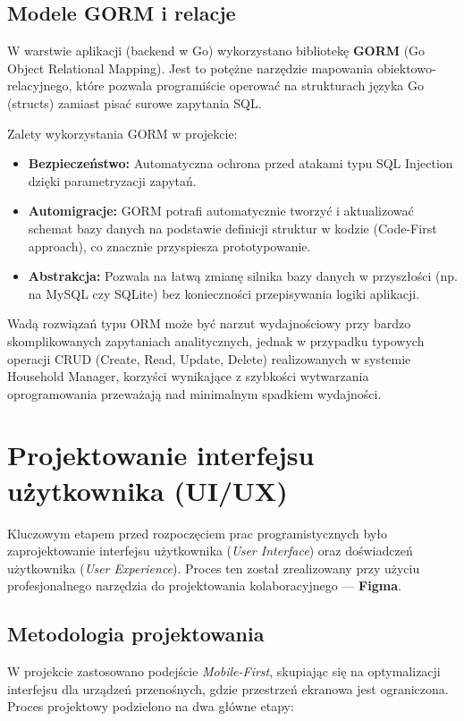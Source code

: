 \subsection{Modele GORM i relacje}

W warstwie aplikacji (backend w Go) wykorzystano bibliotekę \textbf{GORM} (Go Object Relational Mapping). Jest to potężne narzędzie mapowania obiektowo-relacyjnego, które pozwala programiście operować na strukturach języka Go (structs) zamiast pisać surowe zapytania SQL.

Zalety wykorzystania GORM w projekcie:
\begin{itemize}
    \item \textbf{Bezpieczeństwo:} Automatyczna ochrona przed atakami typu SQL Injection dzięki parametryzacji zapytań.
    \item \textbf{Automigracje:} GORM potrafi automatycznie tworzyć i aktualizować schemat bazy danych na podstawie definicji struktur w kodzie (Code-First approach), co znacznie przyspiesza prototypowanie.
    \item \textbf{Abstrakcja:} Pozwala na łatwą zmianę silnika bazy danych w przyszłości (np. na MySQL czy SQLite) bez konieczności przepisywania logiki aplikacji.
\end{itemize}

Wadą rozwiązań typu ORM może być narzut wydajnościowy przy bardzo skomplikowanych zapytaniach analitycznych, jednak w przypadku typowych operacji CRUD (Create, Read, Update, Delete) realizowanych w systemie Household Manager, korzyści wynikające z szybkości wytwarzania oprogramowania przeważają nad minimalnym spadkiem wydajności.

\section{Projektowanie interfejsu użytkownika (UI/UX)}

Kluczowym etapem przed rozpoczęciem prac programistycznych było zaprojektowanie interfejsu użytkownika (\textit{User Interface}) oraz doświadczeń użytkownika (\textit{User Experience}). Proces ten został zrealizowany przy użyciu profesjonalnego narzędzia do projektowania kolaboracyjnego --- \textbf{Figma}.

\subsection{Metodologia projektowania}

W projekcie zastosowano podejście \textit{Mobile-First}, skupiając się na optymalizacji interfejsu dla urządzeń przenośnych, gdzie przestrzeń ekranowa jest ograniczona. Proces projektowy podzielono na dwa główne etapy:

